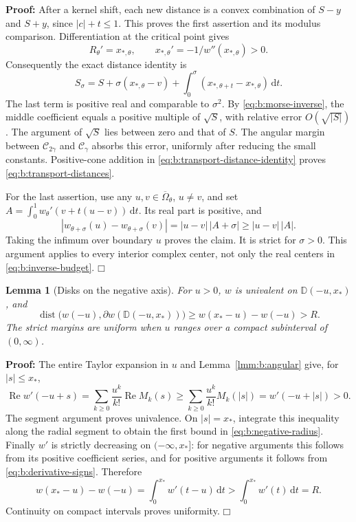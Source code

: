 \documentclass[a4paper,10pt]{article}
\numberwithin{equation}{section}
\newcommand{\dd}{\mathrm{d}}
\theoremstyle{paperplain}
\newtheorem{lmm}[thm]{Lemma}
\theoremstyle{paperremark}
\theoremstyle{paperplain}
\newenvironment{prf}{\noindent \textbf{Proof: }}{\hfill $\mdlgwhtsquare$\par\addvspace{0.5\baselineskip}}
\begin{document}
\begin{prf}
After a kernel shift, each new distance is a convex combination
of $S-y$ and $S+y$, since $|c|+t\leq1$. This proves the first
assertion and its modulus comparison.
Differentiation at the critical point gives
\[
 R_\theta'=x_{*,\theta},\qquad
 x_{*,\theta}'=-1/w''(x_{*,\theta})>0.
\]
Consequently the exact distance identity is
\begin{equation}\label{eq:b:transport-distance-identity}
 S_\sigma=S+\sigma(x_{*,\theta}-v)
       +\int_0^\sigma(x_{*,\theta+t}-x_{*,\theta})\,\dd t.
\end{equation}
The last term is positive real and comparable to $\sigma^2$.
By \eqref{eq:b:morse-inverse}, the middle coefficient equals a
positive multiple of $\sqrt S$, with relative error $O(\sqrt{|S|})$.
The argument of $\sqrt S$ lies between zero and that of $S$.
The angular margin between $\mathcal C_{2\gamma}$ and
$\mathcal C_\gamma$ absorbs this error, uniformly after reducing
the small constants. Positive-cone addition in
\eqref{eq:b:transport-distance-identity} proves
\eqref{eq:b:transport-distances}.

For the last assertion, use any $u,v\in\overline\Omega_\theta$,
$u\ne v$, and set
$A=\int_0^1w_\theta'(v+t(u-v))\,\dd t$.
Its real part is positive, and
\[
 |w_{\theta+\sigma}(u)-w_{\theta+\sigma}(v)|
              =|u-v|\,|A+\sigma|\geq|u-v|\,|A|.
\]
Taking the infimum over boundary $u$ proves the claim. It is strict
for $\sigma>0$. This argument applies to every interior complex
center, not only the real centers in \eqref{eq:b:inverse-budget}.
\end{prf}

\begin{lmm}[Disks on the negative axis]\label{lmm:b:negative-disks}
For $u>0$, $w$ is univalent on $\mathbb D(-u,x_*)$, and
\begin{equation}\label{eq:b:negative-radius}
 \operatorname{dist}\bigl(w(-u),
                   \partial w(\mathbb D(-u,x_*))\bigr)
 \geq w(x_*-u)-w(-u)>R.
\end{equation}
The strict margins are uniform when $u$ ranges over a compact
subinterval of $(0,\infty)$.
\end{lmm}
\begin{prf}
The entire Taylor expansion in $u$ and
Lemma~\ref{lmm:b:angular} give, for $|s|\leq x_*$,
\[
 \operatorname{Re}w'(-u+s)
 =\sum_{k\geq0}\frac{u^k}{k!}\operatorname{Re}M_k(s)
 \geq\sum_{k\geq0}\frac{u^k}{k!}M_k(|s|)
 =w'(-u+|s|)>0.
\]
The segment argument proves univalence. On $|s|=x_*$, integrate
this inequality along the radial segment to obtain the first bound
in \eqref{eq:b:negative-radius}. Finally $w'$ is strictly decreasing
on $(-\infty,x_*]$: for negative arguments this follows from its
positive coefficient series, and for positive arguments it follows
from \eqref{eq:b:derivative-signs}. Therefore
\[
 w(x_*-u)-w(-u)=\int_0^{x_*}w'(t-u)\,\dd t
                           >\int_0^{x_*}w'(t)\,\dd t=R.
\]
Continuity on compact intervals proves uniformity.
\end{prf}
\end{document}
